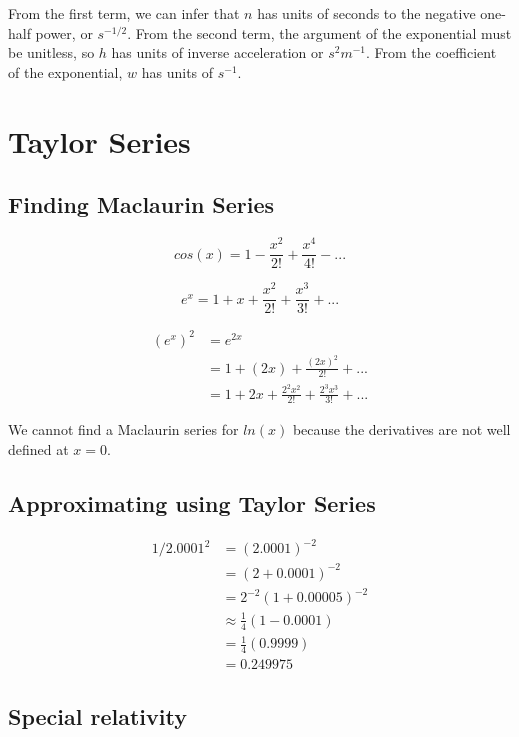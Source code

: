 \documentclass{article}
\begin{document}
From the first term, we can infer that $n$ has units of seconds to the negative one-half power, or $s^{-1/2}$. From the second term, the argument of the exponential must be unitless, so $h$ has units of inverse acceleration or $s^2 m^{-1}$. From the coefficient of the exponential, $w$ has units of $s^{-1}$.

\newpage

\section{Taylor Series}

\subsection{Finding Maclaurin Series}

\begin{equation}
cos(x) = 1 - \frac{x^2}{2!} + \frac{x^4}{4!} - ...
\end{equation}

\begin{equation}
e^x = 1 + x + \frac{x^2}{2!} + \frac{x^3}{3!} + ...
\end{equation}

\begin{align*}
(e^x)^2 &= e^{2x} \\
&= 1 + (2x) + \frac{(2x)^2}{2!} + ... \\
&= 1 + 2x + \frac{2^2x^2}{2!} + \frac{2^3x^3}{3!} + ...
\end{align*}

We cannot find a Maclaurin series for $ln(x)$ because the derivatives are not well defined at $x=0$.

\subsection{Approximating using Taylor Series}

\begin{align*}
1/2.0001^2 &= (2.0001)^{-2} \\
&= (2 + 0.0001)^{-2} \\
&= 2^{-2}(1+0.00005)^{-2} \\
&\approx \frac{1}{4}(1-0.0001) \\
&= \frac{1}{4}(0.9999) \\
&= 0.249975
\end{align*}

\subsection{Special relativity}
\end{document}
